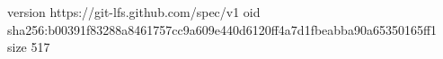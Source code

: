 version https://git-lfs.github.com/spec/v1
oid sha256:b00391f83288a8461757cc9a609e440d6120ff4a7d1fbeabba90a65350165ff1
size 517
